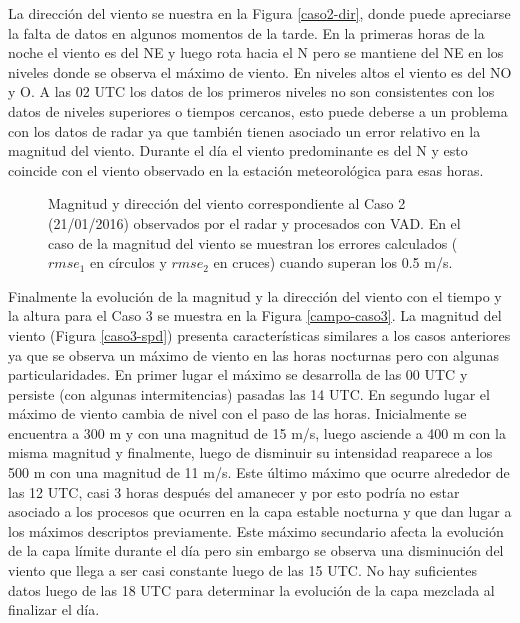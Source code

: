 \documentclass[12pt,spanish,oneside, a4paper]{book}
\begin{document}
La dirección del viento se nuestra en la Figura \ref{caso2-dir}, donde
puede apreciarse la falta de datos en algunos momentos de la tarde. En
la primeras horas de la noche el viento es del NE y luego rota hacia el
N pero se mantiene del NE en los niveles donde se observa el máximo de
viento. En niveles altos el viento es del NO y O. A las 02 UTC los datos
de los primeros niveles no son consistentes con los datos de niveles
superiores o tiempos cercanos, esto puede deberse a un problema con los
datos de radar ya que también tienen asociado un error relativo en la
magnitud del viento. Durante el día el viento predominante es del N y
esto coincide con el viento observado en la estación meteorológica para
esas horas.

\begin{figure}
\newline{}\caption{Magnitud y dirección del viento  correspondiente al Caso 2 (21/01/2016) observados por el radar y procesados con VAD. En el caso de la magnitud del viento se muestran los errores calculados ($rmse_1$ en círculos y $rmse_2$ en cruces) cuando superan los 0.5 m/s. \label{campo-caso2}}\label{fig:campo-caso2}
\end{figure}

Finalmente la evolución de la magnitud y la dirección del viento con el
tiempo y la altura para el Caso 3 se muestra en la Figura
\ref{campo-caso3}. La magnitud del viento (Figura \ref{caso3-spd})
presenta características similares a los casos anteriores ya que se
observa un máximo de viento en las horas nocturnas pero con algunas
particularidades. En primer lugar el máximo se desarrolla de las 00 UTC
y persiste (con algunas intermitencias) pasadas las 14 UTC. En segundo
lugar el máximo de viento cambia de nivel con el paso de las horas.
Inicialmente se encuentra a 300 m y con una magnitud de 15 m/s, luego
asciende a 400 m con la misma magnitud y finalmente, luego de disminuir
su intensidad reaparece a los 500 m con una magnitud de 11 m/s. Este
último máximo que ocurre alrededor de las 12 UTC, casi 3 horas después
del amanecer y por esto podría no estar asociado a los procesos que
ocurren en la capa estable nocturna y que dan lugar a los máximos
descriptos previamente. Este máximo secundario afecta la evolución de la
capa límite durante el día pero sin embargo se observa una disminución
del viento que llega a ser casi constante luego de las 15 UTC. No hay
suficientes datos luego de las 18 UTC para determinar la evolución de la
capa mezclada al finalizar el día.
\end{document}
